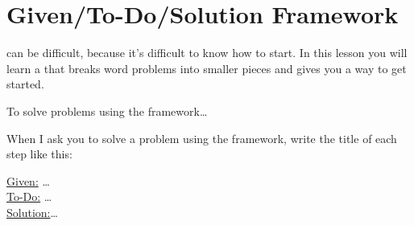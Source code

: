 \section{Given/To-Do/Solution Framework}

  can be difficult,
because it's difficult to know how to start.
In this lesson you will learn a  
that breaks word problems into smaller pieces 
and gives you a way to get started.

\vfil 

\begin{myConceptSteps}{To solve problems using the  framework\dots}
\end{myConceptSteps}

\vfil 

\begin{tcolorbox}[center,width=5.5in]
    When I ask you to solve a problem using the 
     framework,
    write the title of each step like this:
    {
        \begin{adjustwidth}{2em}{0in}
            \selectfont 
            {\underline{Given:}   \hspace{0.2in}\huge\dots}\\[1\onelineskip]
            {\underline{To-Do:}   \hspace{0.2in}\huge\dots}\\[1\onelineskip]
            {\underline{Solution:}\hspace{0.2in}\huge\dots}
        \end{adjustwidth}
    }
\end{tcolorbox}

\vfil 

